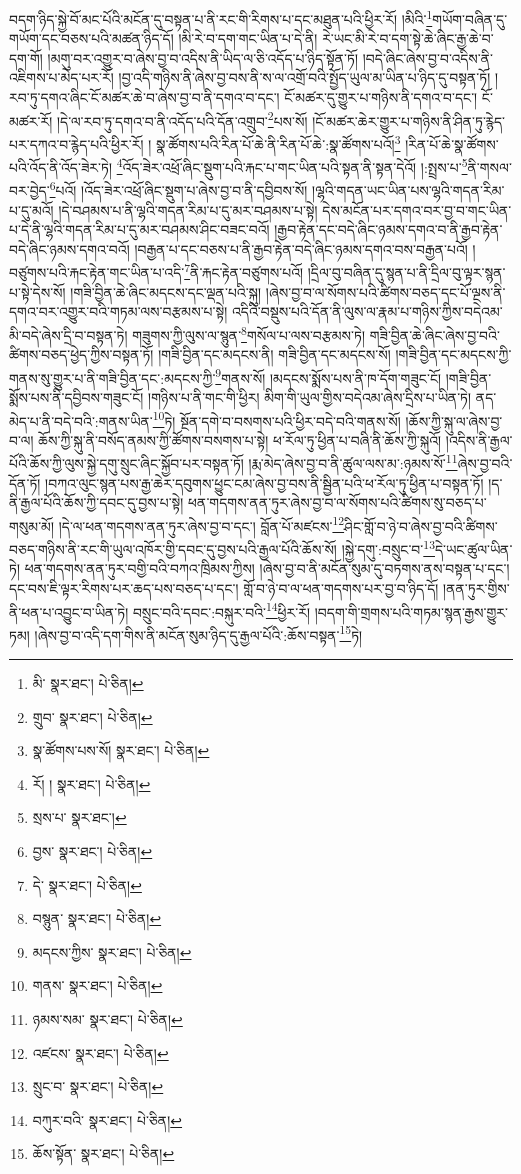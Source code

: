 བདག་ཉིད་སྐྱེ་བོ་མང་པོའི་མངོན་དུ་བསྟན་པ་ནི་རང་གི་རིགས་པ་དང་མཐུན་པའི་ཕྱིར་རོ། །མིའི་\footnote{མི་  སྣར་ཐང་།  པེ་ཅིན། }གཡོག་བཞིན་དུ་གཡོག་དང་བཅས་པའི་མཚན་ཉིད་དོ། །མི་རེ་བ་དག་གང་ཡིན་པ་དེ་ནི། རེ་ཡང་མི་རེ་བ་དག་སྟེ་ཆེ་ཞིང་རྒྱ་ཆེ་བ་དག་གོ། །མགུ་བར་འགྱུར་བ་ཞེས་བྱ་བ་འདིས་ནི་ཡིད་ལ་ཅི་འདོད་པ་ཉིད་སྟོན་ཏོ། །བདེ་ཞིང་ཞེས་བྱ་བ་འདིས་ནི་འཇིགས་པ་མེད་པར་རོ། །བྱ་འདི་གཉིས་ནི་ཞེས་བྱ་བས་ནི་ས་ལ་འགྲོ་བའི་སྤྱོད་ཡུལ་མ་ཡིན་པ་ཉིད་དུ་བསྟན་ཏོ། །རབ་ཏུ་དགའ་ཞིང་ངོ་མཚར་ཆེ་བ་ཞེས་བྱ་བ་ནི་དགའ་བ་དང་། ངོ་མཚར་དུ་གྱུར་པ་གཉིས་ནི་དགའ་བ་དང་། ངོ་མཚར་རོ། །དེ་ལ་རབ་ཏུ་དགའ་བ་ནི་འདོད་པའི་དོན་འགྲུབ་\footnote{གྲུབ་  སྣར་ཐང་།  པེ་ཅིན། }པས་སོ། །ངོ་མཚར་ཆེར་གྱུར་པ་གཉིས་ནི་ཤིན་ཏུ་རྙེད་པར་དཀའ་བ་རྙེད་པའི་ཕྱིར་རོ། །
སྣ་ཚོགས་པའི་རིན་པོ་ཆེ་ནི་རིན་པོ་ཆེ་:སྣ་ཚོགས་པའོ།\footnote{སྣ་ཚོགས་པས་སོ།  སྣར་ཐང་།  པེ་ཅིན། } །རིན་པོ་ཆེ་སྣ་ཚོགས་པའི་འོད་ནི་འོད་ཟེར་ཏེ། \footnote{རོ། །   སྣར་ཐང་།  པེ་ཅིན། }འོད་ཟེར་འཕྲོ་ཞིང་སྡུག་པའི་རྐང་པ་གང་ཡིན་པའི་སྟན་ནི་སྟན་དེའོ། །:སྤྲས་པ་\footnote{སྲས་པ་  སྣར་ཐང་། }ནི་གསལ་བར་བྱེད་\footnote{བྱས་  སྣར་ཐང་།  པེ་ཅིན། }པའོ། །འོད་ཟེར་འཕྲོ་ཞིང་སྡུག་པ་ཞེས་བྱ་བ་ནི་དབྱིབས་སོ། །ལྷའི་གདན་ཡང་ཡིན་པས་ལྷའི་གདན་རིམ་པ་དུ་མའོ། །དེ་བཤམས་པ་ནི་ལྷའི་གདན་རིམ་པ་དུ་མར་བཤམས་པ་སྟེ། དེས་མངོན་པར་དགའ་བར་བྱ་བ་གང་ཡིན་པ་དེ་ནི་ལྷའི་གདན་རིམ་པ་དུ་མར་བཤམས་ཤིང་བཟང་བའོ། །རྒྱབ་རྟེན་དང་བདེ་ཞིང་ཉམས་དགའ་བ་ནི་རྒྱབ་རྟེན་བདེ་ཞིང་ཉམས་དགའ་བའོ། །བརྒྱན་པ་དང་བཅས་པ་ནི་རྒྱབ་རྟེན་བདེ་ཞིང་ཉམས་དགའ་བས་བརྒྱན་པའོ། །བཙུགས་པའི་རྐང་རྟེན་གང་ཡིན་པ་འདི་\footnote{དེ་  སྣར་ཐང་།  པེ་ཅིན། }ནི་རྐང་རྟེན་བཙུགས་པའོ། །དྲིལ་བུ་བཞིན་དུ་སྙན་པ་ནི་དྲིལ་བུ་ལྟར་སྙན་པ་སྟེ་དེས་སོ། །གཟི་བྱིན་ཆེ་ཞིང་མདངས་དང་ལྡན་པའི་སྐུ། །ཞེས་བྱ་བ་ལ་སོགས་པའི་ཚིགས་བཅད་དང་པོ་ལྔས་ནི་དགའ་བར་འགྱུར་བའི་གཏམ་ལས་བརྩམས་པ་སྟེ། འདིའི་བསྡུས་པའི་དོན་ནི་ལུས་ལ་རྣམ་པ་གཉིས་ཀྱིས་བདེའམ་མི་བདེ་ཞེས་དྲི་བ་བསྟན་ཏེ། གཟུགས་ཀྱི་ལུས་ལ་སྙུན་\footnote{བསྙུན་  སྣར་ཐང་།  པེ་ཅིན། }གསོལ་པ་ལས་བརྩམས་ཏེ། གཟི་བྱིན་ཆེ་ཞིང་ཞེས་བྱ་བའི་ཚིགས་བཅད་ཕྱེད་ཀྱིས་བསྟན་ཏོ། །གཟི་བྱིན་དང་མདངས་ནི། གཟི་བྱིན་དང་མདངས་སོ། །གཟི་བྱིན་དང་མདངས་ཀྱི་གནས་སུ་གྱུར་པ་ནི་གཟི་བྱིན་དང་:མདངས་ཀྱི་\footnote{མདངས་ཀྱིས་  སྣར་ཐང་།  པེ་ཅིན། }གནས་སོ། །མདངས་སྨོས་པས་ནི་ཁ་དོག་གཟུང་ངོ། །གཟི་བྱིན་སྨོས་པས་ནི་དབྱིབས་གཟུང་ངོ། །གཉིས་པ་ནི་གང་གི་ཕྱིར། མིག་གི་ཡུལ་གྱིས་བདེའམ་ཞེས་དྲིས་པ་ཡིན་ཏེ། ནད་མེད་པ་ནི་བདེ་བའི་:གནས་ཡིན་\footnote{གནས་  སྣར་ཐང་།  པེ་ཅིན། }ཏེ། སྔོན་དགེ་བ་བསགས་པའི་ཕྱིར་བདེ་བའི་གནས་སོ། །ཆོས་ཀྱི་སྐུ་ལ་ཞེས་བྱ་བ་ལ། ཆོས་ཀྱི་སྐུ་ནི་བསོད་ནམས་ཀྱི་ཚོགས་བསགས་པ་སྟེ། ཕ་རོལ་ཏུ་ཕྱིན་པ་བཞི་ནི་ཆོས་ཀྱི་སྐུའོ། །འདིས་ནི་རྒྱལ་པོའི་ཆོས་ཀྱི་ལུས་སྐྱེ་དགུ་སྲུང་ཞིང་སྐྱོབ་པར་བསྟན་ཏོ། །རྨ་མེད་ཞེས་བྱ་བ་ནི་ཚུལ་ལས་མ་:ཉམས་སོ་\footnote{ཉམས་སམ་  སྣར་ཐང་།  པེ་ཅིན། }ཞེས་བྱ་བའི་དོན་ཏོ། །བཀའ་ལུང་སྙན་པས་རྒྱ་ཆེར་དབུགས་ཕྱུང་ངམ་ཞེས་བྱ་བས་ནི་སྦྱིན་པའི་ཕ་རོལ་ཏུ་ཕྱིན་པ་བསྟན་ཏོ། །ད་ནི་རྒྱལ་པོའི་ཆོས་ཀྱི་དབང་དུ་བྱས་པ་སྟེ། ཕན་གདགས་ནན་ཏུར་ཞེས་བྱ་བ་ལ་སོགས་པའི་ཚིགས་སུ་བཅད་པ་གསུམ་མོ། །དེ་ལ་ཕན་གདགས་ནན་ཏུར་ཞེས་བྱ་བ་དང་། བློན་པོ་མཛངས་\footnote{འཛངས་  སྣར་ཐང་།  པེ་ཅིན། }ཤིང་གློ་བ་ཉེ་བ་ཞེས་བྱ་བའི་ཚིགས་བཅད་གཉིས་ནི་རང་གི་ཡུལ་འཁོར་གྱི་དབང་དུ་བྱས་པའི་རྒྱལ་པོའི་ཆོས་སོ། །སྐྱེ་དགུ་:བསྲུང་བ་\footnote{སྲུང་བ་  སྣར་ཐང་།  པེ་ཅིན། }དེ་ཡང་ཚུལ་ཡིན་ཏེ། ཕན་གདགས་ནན་ཏུར་བགྱི་བའི་བཀའ་ཁྲིམས་ཀྱིས། །ཞེས་བྱ་བ་ནི་མངོན་སུམ་དུ་བཏགས་ནས་བསྟན་པ་དང་། དང་བས་ཇི་ལྟར་རིགས་པར་ཆད་པས་བཅད་པ་དང་། གློ་བ་ཉེ་བ་ལ་ཕན་གདགས་པར་བྱ་བ་ཉིད་དོ། །ནན་ཏུར་གྱིས་ནི་ཕན་པ་འབྱུང་བ་ཡིན་ཏེ། བསྲུང་བའི་དབང་:བསྐུར་བའི་\footnote{བཀུར་བའི་  སྣར་ཐང་།  པེ་ཅིན། }ཕྱིར་རོ། །བདག་གི་གྲགས་པའི་གཏམ་སྙན་རྒྱས་གྱུར་ཏམ། །ཞེས་བྱ་བ་འདི་དག་གིས་ནི་མངོན་སུམ་ཉིད་དུ་རྒྱལ་པོའི་:ཆོས་བསྟན་\footnote{ཆོས་སྟོན་  སྣར་ཐང་།  པེ་ཅིན། }ཏེ། 
